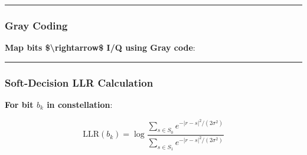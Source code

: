 \begin{center}\rule{0.5\linewidth}{0.5pt}\end{center}

\subsubsection{Gray Coding}\label{gray-coding}

\textbf{Map bits \$\textbackslash rightarrow\$ I/Q using Gray code}:

\begin{Shaded}
\begin{Highlighting}[]
\OperatorTok{=}\NormalTok{ [}\NormalTok{, }\NormalTok{, }\NormalTok{, }\NormalTok{]  }
\OperatorTok{=}\NormalTok{ bits[}\NormalTok{:}\NormalTok{]}
\OperatorTok{=}\NormalTok{ bits[}\NormalTok{:}\NormalTok{]}
    
\OperatorTok{=}
\OperatorTok{=}
    
\OperatorTok{=} \OperatorTok{*}\OperatorTok{{-}}   
\OperatorTok{=} \OperatorTok{*}\OperatorTok{{-}} 
    
    \OperatorTok{+} \OperatorTok{*}
\end{Highlighting}
\end{Shaded}

\begin{center}\rule{0.5\linewidth}{0.5pt}\end{center}

\subsubsection{Soft-Decision LLR
Calculation}\label{soft-decision-llr-calculation}

\textbf{For bit \(b_k\) in constellation}:

\[
\text{LLR}(b_k) = \log\frac{\sum_{s \in S_0} e^{-|r-s|^2/(2\sigma^2)}}{\sum_{s \in S_1} e^{-|r-s|^2/(2\sigma^2)}}
\]

